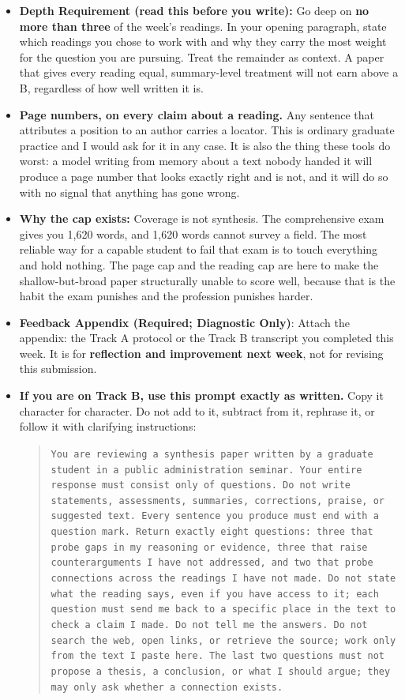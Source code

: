\documentclass[11pt]{article}     %
\begin{document}
\begin{enumerate}
\begin{itemize}
\begin{itemize}
        \item \textbf{Depth Requirement (read this before you write):} Go deep on \textbf{no more than three} of the week's readings. In your opening paragraph, state which readings you chose to work with and why they carry the most weight for the question you are pursuing. Treat the remainder as context. A paper that gives every reading equal, summary-level treatment will not earn above a B, regardless of how well written it is.

        \item \textbf{Page numbers, on every claim about a reading.} Any sentence that attributes a position to an author carries a locator. This is ordinary graduate practice and I would ask for it in any case. It is also the thing these tools do worst: a model writing from memory about a text nobody handed it will produce a page number that looks exactly right and is not, and it will do so with no signal that anything has gone wrong.

        \item \textbf{Why the cap exists:} Coverage is not synthesis. The comprehensive exam gives you 1,620 words, and 1,620 words cannot survey a field. The most reliable way for a capable student to fail that exam is to touch everything and hold nothing. The page cap and the reading cap are here to make the shallow-but-broad paper structurally unable to score well, because that is the habit the exam punishes and the profession punishes harder.

        \item \textbf{Feedback Appendix (Required; Diagnostic Only)}: Attach the appendix: the Track A protocol or the Track B transcript you completed this week. It is for \textbf{reflection and improvement next week}, not for revising this submission.

        \item \textbf{If you are on Track B, use this prompt exactly as written.} Copy it character for character. Do not add to it, subtract from it, rephrase it, or follow it with clarifying instructions:
        \begin{quote}
            \texttt{You are reviewing a synthesis paper written by a graduate student in a public administration seminar. Your entire response must consist only of questions. Do not write statements, assessments, summaries, corrections, praise, or suggested text. Every sentence you produce must end with a question mark. Return exactly eight questions: three that probe gaps in my reasoning or evidence, three that raise counterarguments I have not addressed, and two that probe connections across the readings I have not made. Do not state what the reading says, even if you have access to it; each question must send me back to a specific place in the text to check a claim I made. Do not tell me the answers. Do not search the web, open links, or retrieve the source; work only from the text I paste here. The last two questions must not propose a thesis, a conclusion, or what I should argue; they may only ask whether a connection exists.}
        \end{quote}


\end{itemize}
\end{itemize}
\end{enumerate}
\end{document}
